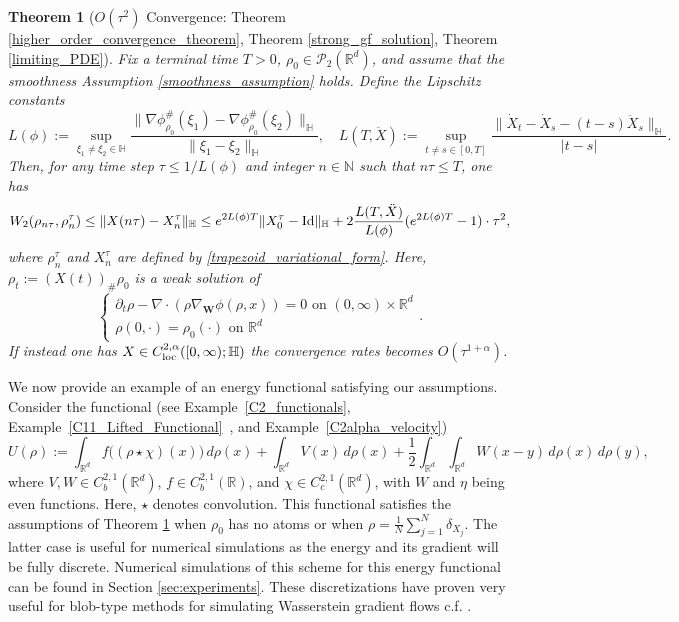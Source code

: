 \documentclass[11pt,a4paper]{amsart}
\def \p{\partial}
\newcommand{\1}{\mathds{1}}
\newcommand{\R}{{\mathbb R}}
\newtheorem{theorem}{\textbf{Theorem}}[section]
\numberwithin{equation}{section}
\begin{document}
\begin{theorem}[$O(\tau^2)$ Convergence: Theorem \ref{higher_order_convergence_theorem}, Theorem \ref{strong_gf_solution}, Theorem \ref{limiting_PDE}] \label{higher_order_convg_intro}
Fix a terminal time $T>0$, $\rho_0 \in \mathcal{P}_2(\mathbb{R}^d)$, and assume that the smoothness Assumption \ref{smoothness_assumption} holds. 
Define the Lipschitz constants
\[
L(\phi) := \sup_{\xi_1 \neq \xi_2 \in \mathbb{H}} \frac{ \| \nabla \phi^{\#}_{\rho_0}(\xi_1) - \nabla \phi^{\#}_{\rho_0}(\xi_2) \|_{\mathbb{H}}}{\|\xi_1 - \xi_2\|_{\mathbb{H}}}, \quad
L(T, \ddot{X}) := \sup_{t \neq s \in [0,T]} \frac{ \| \dot{X}_t - \dot{X}_s - (t - s)\ddot{X}_s \|_{\mathbb{H}} }{|t - s|}.
\]
Then, for any time step $\tau \leq 1/L(\phi)$ and integer $n \in \mathbb{N}$ such that $n\tau \leq T$, one has
\[
W_2(\rho_{n\tau }, \rho_n^{\tau}) \leq \| X(n\tau) - X_n^{\tau} \|_{\mathbb{H}} \leq e^{2 L(\phi) T} \| X_0^{\tau} - \textnormal{Id} \|_{\mathbb{H}} + 2 \frac{L(T, \ddot{X})}{L(\phi)} (e^{2 L(\phi) T} - 1) \cdot \tau^2,
\] where $\rho^{\tau}_n$ and $X^{\tau}_n$ are defined by \eqref{trapezoid_variational_form}. Here, $\rho_t := (X(t))_{\#} \rho_0$ is a weak solution of 
\begin{equation}
\begin{cases}
    \p_t \rho - \nabla \cdot(\rho \nabla_{\mathbf{W}} \phi(\rho,x)) = 0  \text{ on } (0,\infty) \times \R^d  \\
    \rho(0,\cdot)=\rho_0(\cdot) \text{ on } \R^d
\end{cases} \label{gradient_flow_eqn1}.
\end{equation}
If instead one has $X \in C^{2,\alpha}_{\textnormal{loc}}([0,\infty);\mathbb{H})$ the convergence rates becomes $O(\tau^{1+\alpha})$.
\end{theorem}




We now provide an example of an energy functional satisfying our assumptions. Consider the functional (see Example~\ref{C2_functionals}, Example~\ref{C11_Lifted_Functional}~, and Example~\ref{C2alpha_velocity})
\begin{equation}
U(\rho)
:= \int_{\mathbb{R}^d} f\bigl((\rho \star \chi)(x)\bigr)\,d\rho (x)
+ \int_{\mathbb{R}^d} V(x)\,d\rho(x)
+ \frac{1}{2} \int_{\mathbb{R}^d} \int_{\mathbb{R}^d} W(x-y)\,d\rho(x)\,d\rho(y),  \label{model_energy_functional_123}
\end{equation}
where $V,W \in C^{2,1}_b(\mathbb{R}^d)$, $f \in C^{2,1}_b(\mathbb{R})$, and $\chi \in C^{2,1}_c(\mathbb{R}^d)$, with $W$ and $\eta$ being even functions. Here, $\star$ denotes convolution. This functional satisfies the assumptions of Theorem \ref{higher_order_convg_intro} when $\rho_0$ has no atoms or when $\rho = \frac{1}{N} \sum_{j=1}^{N} \delta_{X_j}$. The latter case is useful for numerical simulations as the energy and its gradient will be fully discrete.  Numerical simulations of this scheme for this energy functional can be found in Section \ref{sec:experiments}.  These discretizations have proven very useful for blob-type methods for simulating Wasserstein gradient flows c.f. \cite{Carrillo2019, Daneri2022-fr, doi:10.1142/S0219891623500212, BURGER2023113347, Craig2023-hj, CRAIG2025782, Carrillo2024-we}.
\end{document}
